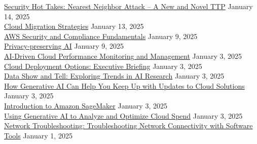 \documentclass[10pt]{res} %
\begin{document}
\begin{resume}
\href{https://bjdelacruz.dev/files/certificates/pluralsight/Security_Hot_Takes_-_Nearest_Neighbor_Attack_-_A_New_and_Novel_TTP.pdf}{\color{blue}Security Hot Takes: Nearest Neighbor Attack -- A New and Novel TTP} \hfill January 14, 2025 \\
\href{https://bjdelacruz.dev/files/certificates/pluralsight/Cloud_Migration_Strategies.pdf}{\color{blue}Cloud Migration Strategies} \hfill January 13, 2025 \\
\href{https://bjdelacruz.dev/files/certificates/pluralsight/AWS_Security_and_Compliance_Fundamentals.pdf}{\color{blue}AWS Security and Compliance Fundamentals} \hfill January 9, 2025 \\
\href{https://bjdelacruz.dev/files/certificates/pluralsight/Privacy-preserving_AI.pdf}{\color{blue}Privacy-preserving AI} \hfill January 9, 2025 \\
\href{https://bjdelacruz.dev/files/certificates/pluralsight/AI-Driven_Cloud_Performance_Monitoring_and_Management.pdf}{\color{blue}AI-Driven Cloud Performance Monitoring and Management} \hfill January 3, 2025 \\
\href{https://bjdelacruz.dev/files/certificates/pluralsight/Cloud_Deployment_Options_-_Executive_Briefing.pdf}{\color{blue}Cloud Deployment Options: Executive Briefing} \hfill January 3, 2025 \\
\href{https://bjdelacruz.dev/files/certificates/pluralsight/Data_Show_and_Tell_-_Exploring_Trends_in_AI_Research.pdf}{\color{blue}Data Show and Tell: Exploring Trends in AI Research} \hfill January 3, 2025 \\
\href{https://bjdelacruz.dev/files/certificates/pluralsight/How_Generative_AI_Can_Help_You_Keep_Up_with_Updates_to_Cloud_Solutions.pdf}{\color{blue}How Generative AI Can Help You Keep Up with Updates to Cloud Solutions} \hfill January 3, 2025 \\
\href{https://bjdelacruz.dev/files/certificates/pluralsight/Introduction_to_Amazon_SageMaker.pdf}{\color{blue}Introduction to Amazon SageMaker} \hfill January 3, 2025 \\
\href{https://bjdelacruz.dev/files/certificates/pluralsight/Using_Generative_AI_to_Analyze_and_Optimize_Cloud_Spend.pdf}{\color{blue}Using Generative AI to Analyze and Optimize Cloud Spend} \hfill January 3, 2025 \\
\href{https://bjdelacruz.dev/files/certificates/pluralsight/Network_Troubleshooting_-_Troubleshooting_Network_Connectivity_with_Software_Tools.pdf}{\color{blue}Network Troubleshooting: Troubleshooting Network Connectivity with Software Tools} \hfill January 1, 2025 \\

\end{resume}
\end{document}
